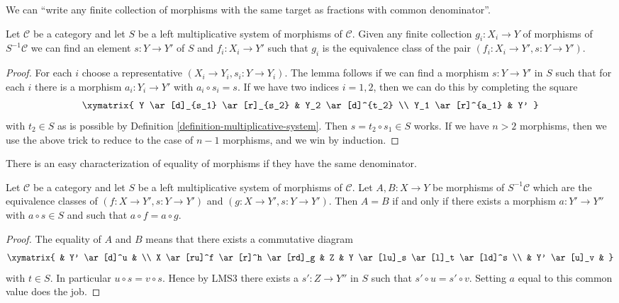 \noindent
We can ``write any finite collection of morphisms with the same target
as fractions with common denominator''.

\begin{lemma}
\label{lemma-morphisms-left-localization}
Let $\mathcal{C}$ be a category and let $S$ be a left multiplicative
system of morphisms of $\mathcal{C}$. Given any finite collection
$g_i : X_i \to Y$ of morphisms of $S^{-1}\mathcal{C}$
we can find an element $s : Y \to Y'$ of $S$ and
$f_i : X_i \to Y'$ such that
$g_i$ is the equivalence class of the pair
$(f_i : X_i \to Y', s : Y \to Y')$.
\end{lemma}

\begin{proof}
For each $i$ choose a representative $(X_i \to Y_i, s_i : Y \to Y_i)$.
The lemma follows if we can find a morphism $s : Y \to Y'$ in $S$ such that
for each $i$ there is a morphism $a_i : Y_i \to Y'$ with
$a_i \circ s_i = s$. If we have two indices $i = 1, 2$, then we can
do this by completing the square
$$
\xymatrix{
Y \ar[d]_{s_1} \ar[r]_{s_2} & Y_2 \ar[d]^{t_2} \\
Y_1 \ar[r]^{a_1} & Y'
}
$$
with $t_2 \in S$ as is possible by
Definition \ref{definition-multiplicative-system}.
Then $s = t_2 \circ s_1 \in S$ works.
If we have $n > 2$ morphisms, then we use the above trick to reduce
to the case of $n - 1$ morphisms, and we win by induction.
\end{proof}

\noindent
There is an easy characterization of equality of morphisms if they
have the same denominator.

\begin{lemma}
\label{lemma-equality-morphisms-left-localization}
Let $\mathcal{C}$ be a category and let $S$ be a left multiplicative
system of morphisms of $\mathcal{C}$. Let $A, B : X \to Y$ be
morphisms of $S^{-1}\mathcal{C}$ which are the equivalence
classes of $(f : X \to Y', s : Y \to Y')$ and
$(g : X \to Y', s : Y \to Y')$. Then
$A = B$ if and only if there exists a morphism
$a : Y' \to Y''$ with $a \circ s \in S$ and
such that $a \circ f = a \circ g$.
\end{lemma}

\begin{proof}
The equality of $A$ and $B$ means that there exists a commutative diagram
$$
\xymatrix{
 & Y' \ar[d]^u & \\
X \ar[ru]^f \ar[r]^h \ar[rd]_g &
Z &
Y \ar[lu]_s \ar[l]_t \ar[ld]^s \\
& Y' \ar[u]_v &
}
$$
with $t \in S$. In particular $u \circ s = v \circ s$. Hence by LMS3 there
exists a $s' : Z \to Y''$ in $S$ such that $s' \circ u = s' \circ v$.
Setting $a$ equal to this common value does the job.
\end{proof}

